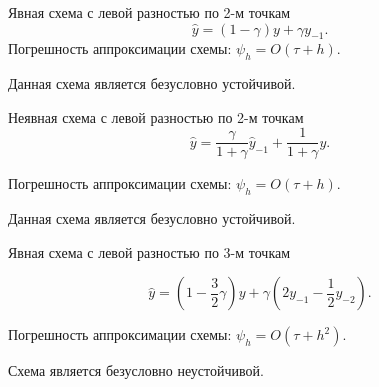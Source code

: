 \documentclass{beamer}
\begin{document}
\begin{frame}
	\begin{block}{Явная схема с левой разностью по 2-м точкам}
	\begin{equation*}
		\widehat{y} = (1 - \gamma) y + \gamma y_{-1}.
		\label{s1}
	\end{equation*}	
	Погрешность аппроксимации схемы: $\psi_h = O(\tau + h)$.
	
	Данная схема является безусловно устойчивой.
		
	\end{block}
	\begin{block}{Неявная схема с левой разностью по 2-м точкам}
	\begin{equation*}
		\widehat{y} = \dfrac{\gamma}{1 + \gamma} \widehat{y}_{-1} + \dfrac{1}{1 + \gamma} y .
		\label{s2}
	\end{equation*}
	
	Погрешность аппроксимации схемы: $\psi_h = O(\tau + h)$.
	
	Данная схема является безусловно устойчивой.
	
	\end{block}
	
	\begin{block}{Явная схема с левой разностью по 3-м точкам}
	
	\begin{equation*}
		\widehat{y} = (1 - \frac{3}{2}\gamma) y + \gamma(2y_{-1} - \frac{1}{2}y_{-2}).
		\label{s3}
	\end{equation*}
	
	Погрешность аппроксимации схемы: 
	$\psi_h = O(\tau + h^2)$.
	
	Схема является безусловно неустойчивой.
		
	\end{block}
\end{frame}
\end{document}
